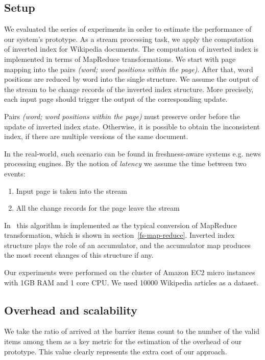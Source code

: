 
\label{fs-experiments-section}

\subsection{Setup}
We evaluated the series of experiments in order to estimate the performance of our system's prototype. As a stream processing task, we apply the computation of inverted index for Wikipedia documents. The computation of inverted index is implemented in terms of MapReduce transformations. We start with page mapping into the pairs {\it (word; word positions within the page)}. After that, word positions are reduced by word into the single structure. We assume the output of the stream to be change records of the inverted index structure. More precisely, each input page should trigger the output of the corresponding update. 

Pairs {\it (word; word positions within the page)} must preserve order before the update of inverted index state. Otherwise, it is possible to obtain the inconsistent index, if there are multiple versions of the same document.  

In the real-world, such scenario can be found in freshness-aware systems e.g. news processing engines. By the notion of {\it latency} we assume the time between two events: 
\begin{enumerate}
    \item Input page is taken into the stream
    \item All the change records for the page leave the stream
\end{enumerate}

In \FlameStream\ this algorithm is implemented as the typical conversion of MapReduce transformation, which is shown in section~\ref{fs-map-reduce}. Inverted index structure plays the role of an accumulator, and the accumulator map produces the most recent changes of this structure if any.

Our experiments were performed on the cluster of Amazon EC2 micro instances with 1GB RAM and 1 core CPU. We used 10000 Wikipedia articles as a dataset. 

\subsection{Overhead and scalability}

We take the ratio of arrived at the barrier items count to the number of the valid items among them as a key metric for the estimation of the overhead of our prototype. This value clearly represents the extra cost of our approach.

